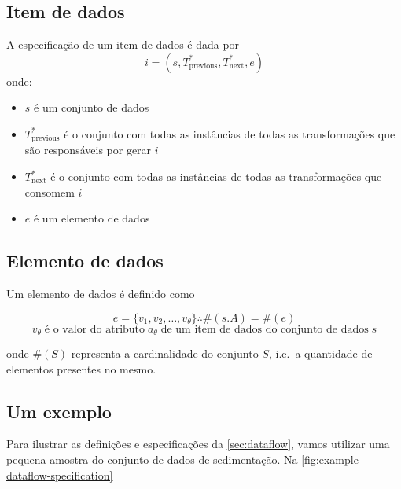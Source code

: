 \subsection{Item de dados}

A especificação de um item de dados é dada por \[ i = (s, T^{\ast}_{\textrm{previous}}, T^{\ast}_{\textrm{next}}, e) \] onde:

\begin{itemize}
    \item \( s \) é um conjunto de dados
    \item \( T^{\ast}_{\textrm{previous}} \) é o conjunto com todas as instâncias de todas as transformações que são responsáveis por gerar \( i \)
    \item \( T^{\ast}_{\textrm{next}} \) é o conjunto com todas as instâncias de todas as transformações que consomem \( i \)
    \item \( e \) é um elemento de dados
\end{itemize}

\subsection{Elemento de dados}

Um elemento de dados é definido como

\[ e = \{ v_1, v_2, \ldots, v_{\theta} \} \therefore \#(s.A) = \#(e) \]
\[ v_{\theta} \; \textrm{é o valor do atributo} \; a_{\theta} \; \textrm{de um item de dados do conjunto de dados} \; s \]

onde \( \#(S) \) representa a cardinalidade do conjunto \( S \), i.e.\ a quantidade de elementos presentes no mesmo.

\subsection{Um exemplo}%
\label{sec:um-exemplo-de-dataflow}

Para ilustrar as definições e especificações da \autoref{sec:dataflow}, vamos utilizar uma pequena amostra do conjunto de dados de sedimentação. Na \autoref{fig:example-dataflow-specification} 

